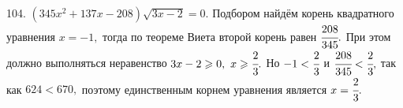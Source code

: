 104. $(345x^2+137x-208)\sqrt{3x-2}=0.$ Подбором найдём корень квадратного уравнения $x=-1,$ тогда по теореме Виета второй корень равен $\cfrac{208}{345}.$ При этом должно выполняться неравенство $3x-2\geqslant0,\ x\geqslant\cfrac{2}{3}.$ Но $-1<\cfrac{2}{3}$ и $\cfrac{208}{345}<\cfrac{2}{3},$ так как $624<670,$ поэтому единственным корнем уравнения является $x=\cfrac{2}{3}.$\\
